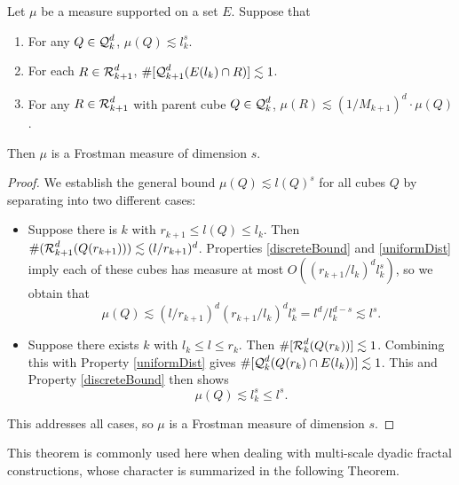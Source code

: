 \begin{lemma} \label{uniformMassFrostman}
	Let $\mu$ be a measure supported on a set $E$. Suppose that
    \begin{enumerate}
    	\item \label{discreteBound} For any $Q \in \operatorname{\mathcal{Q}}_k^d$, $\mu(Q) \lesssim l_k^s$.
    	\item \label{controlledScale} For each $R \in \operatorname{\mathcal{R}}_{k+1}^d$, $\#[\operatorname{\mathcal{Q}}_{k+1}^d(E(l_k) \cap R)] \lesssim 1$.
    	\item \label{uniformDist} For any $R \in \operatorname{\mathcal{R}}_{k+1}^d$ with parent cube $Q \in \operatorname{\mathcal{Q}}_k^d$, $\mu(R) \lesssim (1/M_{k+1})^d \cdot \mu(Q)$.
    \end{enumerate}
	Then $\mu$ is a Frostman measure of dimension $s$.
\end{lemma}
\begin{proof}
	We establish the general bound $\mu(Q) \lesssim l(Q)^s$ for all cubes $Q$ by separating into two different cases:
	\begin{itemize}
		\item Suppose there is $k$ with $r_{k+1} \leq l(Q) \leq l_k$. Then $\#(\operatorname{\mathcal{R}}_{k+1}^d(Q(r_{k+1}))) \lesssim (l/r_{k+1})^d$. Properties \ref{discreteBound} and \ref{uniformDist} imply each of these cubes has measure at most $O( (r_{k+1}/l_k)^d l_k^s)$, so we obtain that
    	\[ \mu(Q) \lesssim (l/r_{k+1})^d (r_{k+1}/l_k)^d l_k^s = l^d / l_k^{d-s} \lesssim l^s. \]

    \item Suppose there exists $k$ with $l_k \leq l \leq r_k$. Then $\#[\operatorname{\mathcal{R}}_k^d(Q(r_k))] \lesssim 1$. Combining this with Property \ref{uniformDist} gives $\#[\operatorname{\mathcal{Q}}_k^d(Q(r_k) \cap E(l_k))] \lesssim 1$. This and Property \ref{discreteBound} then shows
    \[ \mu(Q) \lesssim l_k^s \leq l^s. \]
	\end{itemize}
	This addresses all cases, so $\mu$ is a Frostman measure of dimension $s$.
\end{proof}

This theorem is commonly used here when dealing with multi-scale dyadic fractal constructions, whose character is summarized in the following Theorem.

